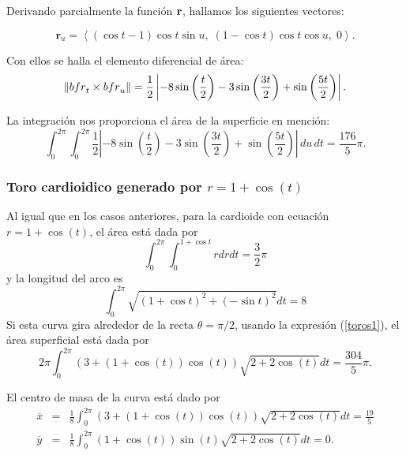 Derivando parcialmente la función ${\bf r}$, hallamos los siguientes vectores:

\begin{flushleft}
\end{flushleft}
\[
{\mathbf r}_{u} = \left\langle (\cos t - 1)\cos t \sin u,\; (1 - \cos t)\cos t \cos u,\; 0 \right\rangle\!.
\]

Con ellos se halla el elemento diferencial de área:
\[
\left\| {\\bf r}_{t} \times {\\bf r}_{u} \right\| = \frac{1}{2} \left| -8\sin\left( \frac{t}{2} \right) - 3\sin\left( \frac{3t}{2} \right) + \sin\left( \frac{5t}{2} \right) \right|.
\]

La integración nos proporciona el área de la superficie en mención:
\[
\int_{0}^{2\pi} \int_{0}^{2\pi} \frac{1}{2} \left| -8\sin\left( \frac{t}{2} \right) - 3\sin\left( \frac{3t}{2} \right) + \sin\left( \frac{5t}{2} \right) \right| \, du \, dt = \frac{176}{5}\pi.
\]

\subsubsection{Toro cardioidico generado por \texorpdfstring{\boldmath$r=1+\cos(t)$\unboldmath}{r=1+cos(t)}}
Al igual que en los casos anteriores, para la cardioide con ecuación
$r=1+\cos (t) $, el área está dada por
\[\int_{0}^{2\pi }\int_{0}^{1+\cos t}rdrdt= \frac{3}{2}\pi\]
y la longitud del arco es
\[\int_{0}^{2\pi }\sqrt{\left( 1+\cos t\right) ^{2}+\left( -\sin t\right) ^{2}}dt= 8\]
Si esta curva gira alrededor de la recta $\theta= \pi/2$, usando la expresión (\ref{toros1}),
el área superficial está dada por
\[2\pi \int_{0}^{2\pi }\left( 3+\left( 1+\cos \left( t\right) \right) \cos
\left( t\right) \right) \sqrt{2+2\cos \left( t\right) }dt= \frac{304}{5}\pi.\]

El centro de masa de la curva está dado por
\begin{eqnarray*}
\overline{x} &=& \frac{1}{8}\int_{0}^{2\pi }\left( 3+\left( 1+\cos \left(
t\right) \right) \cos \left( t\right) \right) \sqrt{2+2\cos \left( t\right) }%
dt= \frac{19}{5} \\
\overline{y} &=& \frac{1}{8}\int_{0}^{2\pi }\left( 1+\cos \left( t\right)
\right) \sin \left( t\right) \sqrt{2+2\cos \left( t\right) }dt= 0.
\end{eqnarray*}

